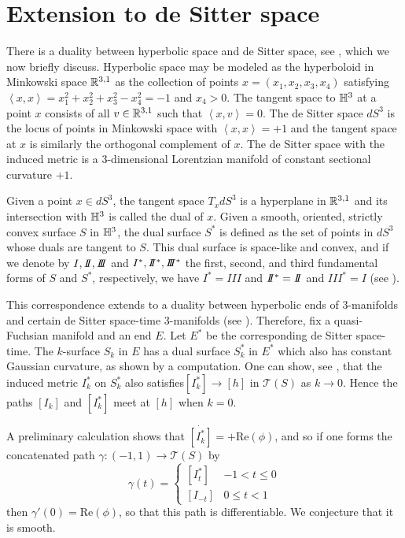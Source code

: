 \section{Extension to de Sitter space}

There is a duality between hyperbolic space and de Sitter space, see \cite{schlenker2002}, which we now briefly discuss. 
Hyperbolic space may be modeled as the hyperboloid in Minkowski space $\mathbb{R}^{3,1}$ as the collection of points $x = (x_1,x_2,x_3,x_4)$ satisfying $\left< x , x \right> = x_1^2 + x_2^2 + x_3^2 - x_4^2 = -1$ and $x_4 > 0$. 
The tangent space to $\mathbb{H}^3$ at a point $x$ consists of all $v \in \mathbb{R}^{3,1}$ such that $\left<x,v\right> = 0$.
The de Sitter space $dS^3$ is the locus of points in Minkowski space with $\left<x,x\right> = + 1$ and the tangent space at $x$ is similarly the orthogonal complement of $x$.
The de Sitter space with the induced metric is a 3-dimensional Lorentzian manifold of constant sectional curvature $+1$. 

Given a point $x \in dS^3$, the tangent space $T_xdS^3$ is a hyperplane in $\mathbb{R}^{3,1}$ and its intersection with $\mathbb{H}^3$ is called the dual of $x$.
Given a smooth, oriented, strictly convex surface $S$ in $\mathbb{H}^3$, the dual surface $S^*$ is defined as the set of points in $dS^3$ whose duals are tangent to $S$.
This dual surface is space-like and convex, and if we denote by $I,I\!\!I, I\!\!I\!\!I$ and $I^*,I\!\!I^*,I\!\!I\!\!I^*$ the first, second, and third fundamental forms of $S$ and $S^*$, respectively, we have $I^* = I\!\!I\!\!I$ and $I\!\!I^* = I\!\!I$ and $I\!\!I\!\!I^* = I$ (see \cite{labourie1992}).

This correspondence extends to a duality between hyperbolic ends of 3-manifolds and certain de Sitter space-time 3-manifolds (see \cite{mess2007}).
Therefore, fix a quasi-Fuchsian manifold and an end $E$.
Let $E^*$ be the corresponding de Sitter space-time.
The $k$-surface $S_k$ in $E$ has a dual surface $S_k^*$ in $E^*$ which also has constant Gaussian curvature, as shown by a computation. 
One can show, see \cite{labourie1992}, that the induced metric $I_k^*$ on $S_k^*$ also satisfies$[I_k^*] \to [h]$ in $\mathcal{T}(S)$ as $k \to 0$. 
Hence the paths $[I_k]$ and $[I_k^*]$ meet at $[h]$ when $k = 0$. 

A preliminary calculation shows that $\dot{[I_k^*]} = +\mathrm{Re}(\phi)$, and so if one forms the concatenated path $\gamma : (-1,1) \to \mathcal{T}(S)$ by 
\[
\gamma(t) = 
\begin{cases}
[I_t^*]  & -1 < t \leq 0 \\
[I_{-t}] & 0 \leq t < 1
\end{cases}
\]
then $\gamma'(0) = \mathrm{Re}(\phi)$, so that this path is differentiable. 
We conjecture that it is smooth. 
